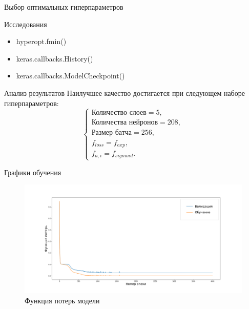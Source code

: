 \documentclass{beamer}
\begin{document}
\begin{frame}{Выбор оптимальных гиперпараметров}
\begin{block}{Исследования}
\begin{itemize}
  \item hyperopt.fmin()
  \item keras.callbacks.History()
  \item keras.callbacks.ModelCheckpoint()
\end{itemize}
\end{block}

\pause
\begin{block}{Анализ результатов}
Наилучшее качество достигается при следующем наборе гиперпараметров:
$$\begin{cases} \mbox{Количество слоев} = 5, \\ \mbox{Количества нейронов} = 208, \\ \mbox{Размер батча} = 256, \\ f_{loss} = f_{exp}, \\ f_{a,i} = f_{sigmoid}. \end{cases}$$
\end{block}
\end{frame}








\begin{frame}{Графики обучения}

\begin{figure}[h]
    \centering
    \includegraphics[scale=0.3]{model_loss}
    \caption{Функция потерь модели}
    \label{fig:loss}
\end{figure}

\end{frame}
\end{document}
